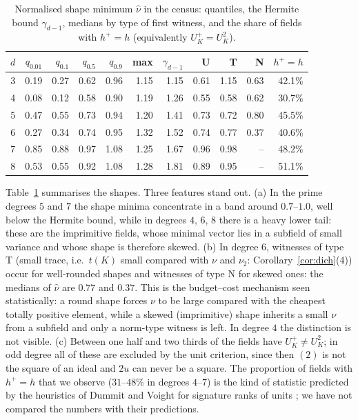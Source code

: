 \begin{table}[t]\caption{Normalised shape minimum $\hat\nu$ in the census: quantiles, the Hermite bound $\gamma_{d-1}$, medians by type of first witness, and the share of fields with $h^+=h$ (equivalently $U_K^+=U_K^2$).}\label{tab:shape}
\begin{tabular}{rrrrrrrrrrr}\toprule
$d$ & $q_{0.01}$ & $q_{0.1}$ & $q_{0.5}$ & $q_{0.9}$ & max & $\gamma_{d-1}$ & U & T & N & $h^+=h$\\\midrule
3 & 0.19 & 0.27 & 0.62 & 0.96 & 1.15 & 1.15 & 0.61 & 1.15 & 0.63 & 42.1\%\\
4 & 0.08 & 0.12 & 0.58 & 0.90 & 1.19 & 1.26 & 0.55 & 0.58 & 0.62 & 30.7\%\\
5 & 0.47 & 0.55 & 0.73 & 0.94 & 1.20 & 1.41 & 0.73 & 0.72 & 0.80 & 45.5\%\\
6 & 0.27 & 0.34 & 0.74 & 0.95 & 1.32 & 1.52 & 0.74 & 0.77 & 0.37 & 40.6\%\\
7 & 0.85 & 0.88 & 0.97 & 1.08 & 1.25 & 1.67 & 0.96 & 0.98 & -- & 48.2\%\\
8 & 0.53 & 0.55 & 0.92 & 1.08 & 1.28 & 1.81 & 0.89 & 0.95 & -- & 51.1\%\\
\bottomrule\end{tabular}\end{table}

Table~\ref{tab:shape} summarises the shapes. Three features stand out.
(a) In the prime degrees $5$ and $7$ the shape minima concentrate in a band around $0.7$--$1.0$, well
below the Hermite bound, while in degrees $4$, $6$, $8$ there is a heavy lower tail: these are the
imprimitive fields, whose minimal vector lies in a subfield of small variance and whose shape is
therefore skewed. (b) In degree $6$, witnesses of type T (small trace, i.e.\ $t(K)$ small
compared with $\nu$ and $\nu_2$: Corollary~\ref{cor:dich}(4)) occur for well-rounded shapes and
witnesses of type N for skewed ones: the medians of $\hat\nu$ are $0.77$ and $0.37$. This is the
budget--cost mechanism seen statistically: a round shape forces $\nu$ to be large compared with the
cheapest totally positive element, while a skewed (imprimitive) shape inherits a small $\nu$ from a
subfield and only a norm-type witness is left. In degree $4$ the distinction is not visible.
(c) Between one half and two thirds of the fields have $U_K^{+}\neq U_K^{2}$; in odd degree all of
these are excluded by the unit criterion, since then $(2)$ is not the square of an ideal and $2u$
can never be a square. The proportion of fields with $h^{+}=h$ that we observe ($31$--$48\%$ in
degrees $4$--$7$) is the kind of statistic predicted by the heuristics of Dummit and Voight for
signature ranks of units \cite{DV}; we have not compared the numbers with their predictions.

